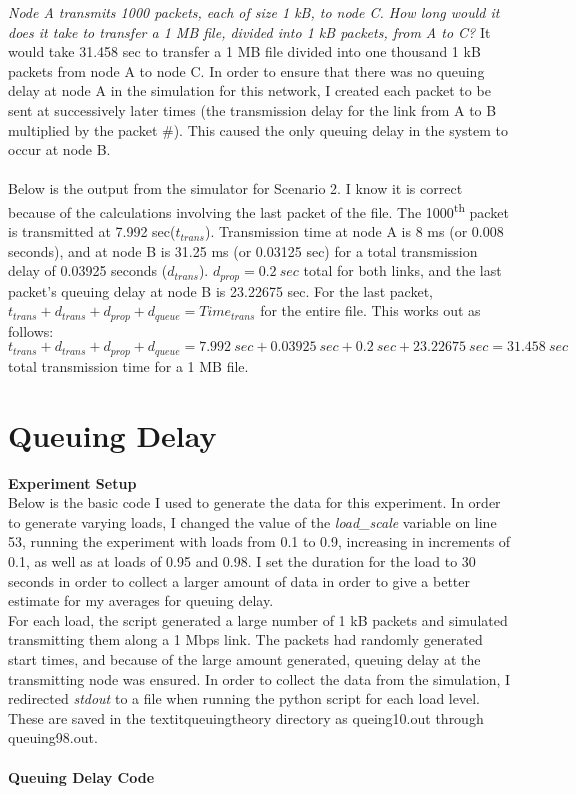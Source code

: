 \documentclass[11pt]{article}
\begin{document}

\textit{Node A transmits 1000 packets, each of size 1 kB, to node C. How long would it does it take to transfer a 1 MB file, divided into 1 kB packets, from A to C?}
\indent It would take 31.458 sec to transfer a 1 MB file divided into one thousand 1 kB packets from node A to node C. In order to ensure that there was no queuing delay at node A in the simulation for this network, I created each packet to be sent at successively later times (the transmission delay for the link from A to B multiplied by the packet \#).  This caused the only queuing delay in the system to occur at node B.\\
\\
Below is the output from the simulator for Scenario 2. I know it is correct because of the calculations involving the last packet of the file. The 1000\textsuperscript{th} packet is transmitted at 7.992 sec($t_{trans}$). Transmission time at node A is 8 ms (or 0.008 seconds), and at node B is 31.25 ms (or 0.03125 sec) for a total transmission delay of 0.03925 seconds ($d_{trans}$). $d_{prop} = 0.2\ sec$ total for both links, and the last packet's queuing delay at node B is 23.22675 sec. For the last packet, $t_{trans} + d_{trans} + d_{prop} + d_{queue} = Time_{trans}$ for the entire file. This works out as follows:
$$t_{trans} + d_{trans} + d_{prop} + d_{queue} = 7.992\ sec + 0.03925\ sec + 0.2\ sec + 23.22675\ sec = 31.458\ sec$$ total transmission time for a 1 MB file.\\


\section{Queuing Delay}
\noindent
\textbf{Experiment Setup}\\
\indent Below is the basic code I used to generate the data for this experiment. In order to generate varying loads, I changed the value of the \textit{load\_scale} variable on line 53, running the experiment with loads from 0.1 to 0.9, increasing in increments of 0.1, as well as at loads of 0.95 and 0.98. I set the duration for the load to 30 seconds in order to collect a larger amount of data in order to give a better estimate for my averages for queuing delay.
\\
For each load, the script generated a large number of 1 kB packets and simulated transmitting them along a 1 Mbps link. The packets had randomly generated start times, and because of the large amount generated, queuing delay at the transmitting node was ensured. In order to collect the data from the simulation, I redirected \textit{stdout} to a file when running the python script for each load level. These are saved in the textit{queuingtheory} directory as queing10.out through queuing98.out.\\\\
\noindent
\textbf{Queuing Delay Code}

\end{document}
